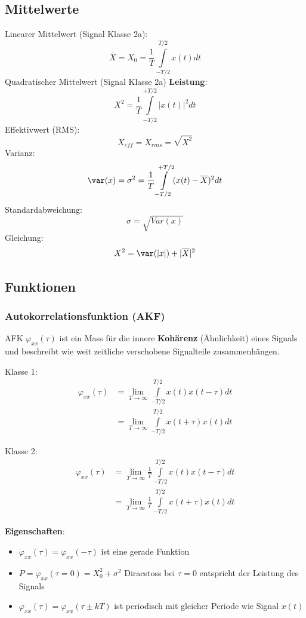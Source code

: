 \subsection{Mittelwerte}

\noindent 
Linearer Mittelwert (Signal Klasse 2a): \[\overline{X} = X_0 = \frac{1}{T}\int\limits_{-T/2}^{T/2}x(t)dt\]
Quadratischer Mittelwert (Signal Klasse 2a) \textbf{Leistung}: \[X^2 =  \frac{1}{T}\int\limits_{-T/2}^{+T/2}\left|x(t)\right|^2dt\] 
Effektivwert (RMS): \[X_{eff} = X_{rms} = \sqrt{X^2}\] 
Varianz: \[ \var(x) =  \sigma^2 = \frac{1}{T}\int\limits_{-T/2}^{+T/2}(x(t) - \overline{X})^2dt \]
Standardabweichung: \[ \sigma = \sqrt{Var(x)}\]
Gleichung: 
\[X^2 = \var(|x|) + |\overline{X}|^2\]

\subsection{Funktionen}
\subsubsection{Autokorrelationsfunktion (AKF)}
AFK $\varphi_{xx}(\tau)$ ist ein Mass für die innere \textbf{Kohärenz} (Ähnlichkeit) eines Signals und beschreibt wie weit zeitliche verschobene Signalteile zusammenhängen.

Klasse 1:
\begin{align*}
	\varphi_{xx}(\tau) &= \lim\limits_{T\rightarrow\infty}\int\limits_{-T/2}^{T/2}x(t)x(t-\tau)dt \\
	&= \lim\limits_{T\rightarrow\infty}\int\limits_{-T/2}^{T/2}x(t+\tau)x(t)dt
\end{align*}

Klasse 2:
\begin{align*}
	\varphi_{xx}(\tau) &= \lim\limits_{T\rightarrow\infty}\frac{1}{T}\int\limits_{-T/2}^{T/2}x(t)x(t-\tau)dt \\
	&= \lim\limits_{T\rightarrow\infty}\frac{1}{T}\int\limits_{-T/2}^{T/2}x(t+\tau)x(t)dt
\end{align*}

\noindent\textbf{Eigenschaften}:
\begin{itemize}[nosep]
	\item $\varphi_{xx}(\tau) = \varphi_{xx}(-\tau)$ ist eine gerade Funktion
	\item $P = \varphi_{xx}(\tau = 0) = X_0^2 + \sigma^2$ Diracstoss bei $\tau =0$ entspricht der Leistung des Signals 
	\item $\varphi_{xx}(\tau) = \varphi_{xx}(\tau \pm kT)$ ist periodisch mit gleicher Periode wie Signal $x(t)$
\end{itemize}

